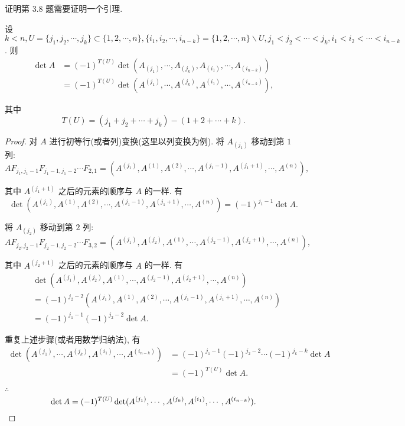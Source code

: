\documentclass{ctexart}
\begin{document}
证明第 3.8 题需要证明一个引理.
\begin{lemma}\label{l5.1}
    设 $k<n,U=\{j_1,j_2,\cdots,j_k\}\subset\{1,2,\cdots,n\},\{i_1,i_2,\cdots,i_{n-k}\}=\{1,2,\cdots,n\}\backslash U,j_1<j_2<\cdots<j_k,i_1<i_2<\cdots<i_{n-k}$. 则
    \begin{align*}
        \det A & =(-1)^{T(U)}\det(A_{(j_1)},\cdots,A_{(j_k)},A_{(i_1)},\cdots,A_{(i_{n-k})}) \\
        & =(-1)^{T(U)}\det(A^{(j_1)},\cdots,A^{(j_k)},A^{(i_1)},\cdots,A^{(i_{n-k})}),
    \end{align*}

    其中
    \[T(U)=(j_1+j_2+\cdots+j_k)-(1+2+\cdots+k).\]
\end{lemma}
\begin{proof}
    对 $A$ 进行初等行(或者列)变换(这里以列变换为例). 将 $A_{(j_{1})}$ 移动到第 $1$ 列:
    \[AF_{j_1,j_1-1}F_{j_1-1,j_1-2}\cdots F_{2,1}=(A^{(j_1)},A^{(1)},A^{(2)},\cdots,A^{(j_{1}-1)},A^{(j_{1}+1)},\cdots,A^{(n)}),\]

    其中 $A^{(j_{1}+1)}$ 之后的元素的顺序与 $A$ 的一样. 有
    \[\det(A^{(j_1)},A^{(1)},A^{(2)},\cdots,A^{(j_{1}-1)},A^{(j_{1}+1)},\cdots,A^{(n)})=(-1)^{j_1-1}\det A.\]

    将 $A_{(j_{2})}$ 移动到第 $2$ 列:
    \[AF_{j_2,j_2-1}F_{j_2-1,j_2-2}\cdots F_{3,2}=(A^{(j_1)},A^{(j_2)},A^{(1)},\cdots,A^{(j_{2}-1)},A^{(j_{2}+1)},\cdots,A^{(n)}),\]

    其中 $A^{(j_{2}+1)}$ 之后的元素的顺序与 $A$ 的一样. 有
    \begin{align*}
        & \det(A^{(j_1)},A^{(j_2)},A^{(1)},\cdots,A^{(j_{2}-1)},A^{(j_{2}+1)},\cdots,A^{(n)}) \\
        & =(-1)^{j_2-2}(A^{(j_1)},A^{(1)},A^{(2)},\cdots,A^{(j_{1}-1)},A^{(j_{1}+1)},\cdots,A^{(n)}) \\
        & =(-1)^{j_1-1}(-1)^{j_2-2}\det A.
    \end{align*}

    重复上述步骤(或者用数学归纳法), 有
    \begin{align*}
        \det(A^{(j_1)},\cdots,A^{(j_k)},A^{(i_1)},\cdots,A^{(i_{n-k})}) & =(-1)^{j_1-1}(-1)^{j_2-2}\cdots(-1)^{j_k-k}\det A \\
        & =(-1)^{T(U)}\det A.
    \end{align*}

    $\therefore$
    \[\det A=(-1)^{T(U)}\det(A^{(j_1)},\cdots,A^{(j_k)},A^{(i_1)},\cdots,A^{(i_{n-k})}).\qedhere\]
\end{proof}
\end{document}
